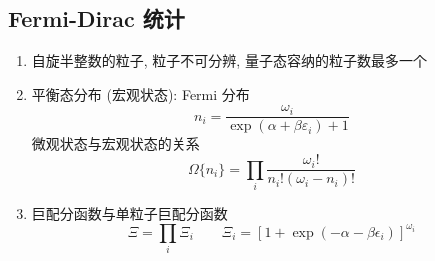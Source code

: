 \documentclass[12pt,a4paper]{article}%
\numberwithin{equation}{section}
\begin{document}
\subsection[Fermi 统计]{Fermi-Dirac 统计} %
\label{sub:fermi_stat}
\begin{enumerate}
    \item 自旋半整数的粒子, 粒子不可分辨, 量子态容纳的粒子数最多一个
    \item 平衡态分布 (宏观状态): Fermi 分布
    \begin{equation}
        n_i = \frac{\omega_i}{\exp(\alpha + \beta\varepsilon_i) + 1}
    \end{equation}
    微观状态与宏观状态的关系
    \begin{equation}
        \Omega\{n_i\} = \prod_i\frac{\omega_i!}{n_i!(\omega_i-n_i)!}
    \end{equation}
    \item 巨配分函数与单粒子巨配分函数
    \begin{equation}
        \Xi = \prod_i\Xi_i \qquad 
        \Xi_i = \left[1+\exp(-\alpha-\beta\epsilon_i)\right]^{\omega_i}
    \end{equation}
\end{enumerate}
\end{document}
